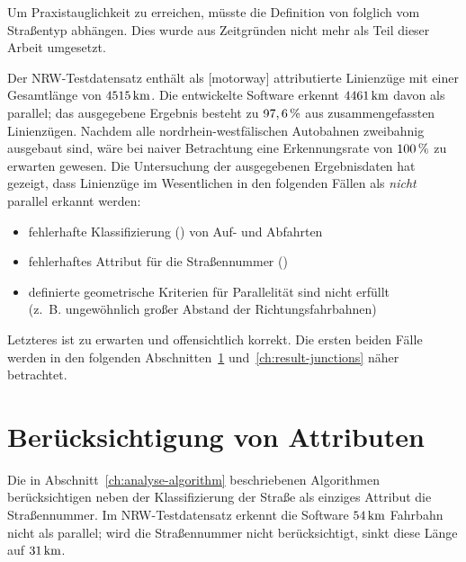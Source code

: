 \documentclass[../main/thesis.tex]{subfiles}
\begin{document}


Um Praxistauglichkeit zu erreichen, müsste die Definition von  folglich vom Straßentyp abhängen.
Dies wurde aus Zeitgründen nicht mehr als Teil dieser Arbeit umgesetzt.

Der NRW-Testdatensatz enthält als [motorway] attributierte Linienzüge mit einer Gesamtlänge von $\unit[4515]{km}$.
Die entwickelte Software erkennt $\unit[4461]{km}$ davon als parallel; das ausgegebene Ergebnis besteht zu $\unit[97,6]{\%}$ aus zusammengefassten Linienzügen.
Nachdem alle nordrhein-westfälischen Autobahnen zweibahnig ausgebaut sind, wäre bei naiver Betrachtung eine Erkennungsrate von $\unit[100]{\%}$ zu erwarten gewesen.
Die Untersuchung der ausgegebenen Ergebnisdaten hat gezeigt, dass Linienzüge im Wesentlichen in den folgenden Fällen als \emph{nicht} parallel erkannt werden:

\begin{itemize}[nosep]
\item fehlerhafte Klassifizierung () von Auf- und Abfahrten
\item fehlerhaftes Attribut für die Straßennummer ()
\item definierte geometrische Kriterien für Parallelität sind nicht erfüllt \\(z.~B. ungewöhnlich großer Abstand der Richtungsfahrbahnen)
\end{itemize}
%
Letzteres ist zu erwarten und offensichtlich korrekt.
Die ersten beiden Fälle werden in den folgenden Abschnitten~\ref{ch:result-tags} und~\ref{ch:result-junctions} näher betrachtet.



\section{Berücksichtigung von Attributen}
\label{ch:result-tags}

Die in Abschnitt~\ref{ch:analyse-algorithm} beschriebenen Algorithmen berücksichtigen neben der Klassifizierung der Straße als einziges Attribut die Straßennummer.
Im NRW-Testdatensatz erkennt die Software $\unit[54]{km}$ Fahrbahn nicht als parallel; wird die Straßennummer nicht berücksichtigt, sinkt diese Länge auf $\unit[31]{km}$.
\end{document}
